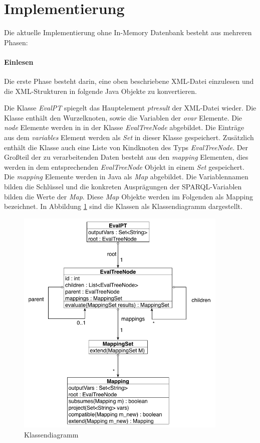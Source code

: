 \documentclass[draft,final]{vutinfth} %
\begin{document}
\section{Implementierung} \label{istImp}

Die aktuelle Implementierung ohne In-Memory Datenbank besteht aus mehreren Phasen:

\paragraph{Einlesen}
Die erste Phase besteht darin, eine oben beschriebene XML-Datei einzulesen und die XML-Strukturen in folgende Java Objekte zu konvertieren.

Die Klasse \textit{EvalPT} spiegelt das Hauptelement \textit{ptresult} der XML-Datei wieder. Die Klasse enthält den Wurzelknoten, sowie die Variablen der \textit{ovar} Elemente. Die \textit{node} Elemente werden in in der Klasse \textit{EvalTreeNode} abgebildet. Die Einträge aus dem \textit{variables} Element werden als \textit{Set} in dieser Klasse gespeichert. Zusätzlich enthält die Klasse auch eine Liste von Kindknoten des Typs \textit{EvalTreeNode}. Der Gro\ss teil der zu verarbeitenden Daten besteht aus den \textit{mapping} Elementen, dies werden in dem entsprechenden \textit{EvalTreeNode} Objekt in einem \textit{Set} gespeichert. Die \textit{mapping} Elemente werden in Java als \textit{Map} abgebildet. Die Variablennamen bilden die Schlüssel und die konkreten Ausprägungen der SPARQL-Variablen bilden die Werte der \textit{Map}. Diese \textit{Map} Objekte werden im Folgenden als Mapping bezeichnet. In Abbildung \ref{klassendiagramm} sind die Klassen als Klassendiagramm dargestellt. 

\begin{figure}[ht]
	\centering
	\includegraphics[width=0.9\textwidth]{Klassendiagramm}
	\caption{Klassendiagramm}
	\label{klassendiagramm}
\end{figure}
\end{document}
